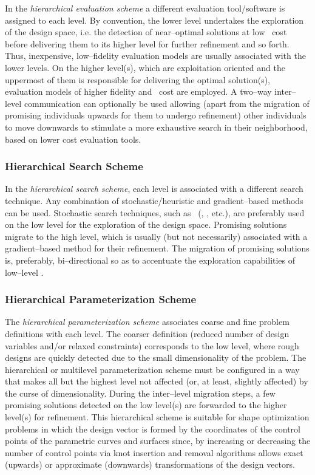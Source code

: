 \documentclass{vki_ls}
\begin{document}
In the \textit{hierarchical evaluation scheme} a different evaluation tool/software is assigned to each level. By convention, the lower level undertakes the exploration of the design space, i.e. the detection of near--optimal solutions at low \CPU\ cost before delivering them to its higher level for further refinement and so forth. 
Thus, inexpensive, low--fidelity evaluation models are usually associated with the lower levels. On the higher level(s), which are exploitation oriented and the uppermost of them is responsible for delivering the optimal solution(s), evaluation models of higher fidelity and \CPU\ cost are employed. 
A two--way inter--level communication can optionally be used allowing (apart from the migration of promising individuals upwards for them to undergo refinement) other individuals to move downwards to stimulate a more exhaustive search in their neighborhood, based on lower cost evaluation tools.

\subsubsection*{Hierarchical Search Scheme}

In the \textit{hierarchical search scheme}, each level is associated with a different search technique. Any combination of stochastic/heuristic and gradient--based methods can be used. Stochastic search techniques, such as \EAs\ (\DEAs, \DMAEAs, etc.), are preferably used on the low level for the exploration of the design space.  Promising solutions migrate to the high level, which is usually (but not necessarily) associated with a gradient--based method for their refinement.  The migration of promising solutions is, preferably, bi--directional so as to accentuate the exploration capabilities of low--level \EAs.

\subsubsection*{Hierarchical Parameterization Scheme}

The \textit{hierarchical parameterization scheme} associates coarse and fine problem definitions with each level. The coarser definition (reduced number of design variables and/or relaxed constraints) corresponds to the low level, where rough designs are quickly detected due to the small dimensionality of the problem. The hierarchical or multilevel parameterization scheme must be configured in a way that makes all but the highest level not affected (or, at least, slightly affected) by the curse of dimensionality. During the inter--level migration steps, a few promising solutions detected on the low level(s) are forwarded to the higher level(s) for refinement. This hierarchical scheme is suitable for shape optimization problems in which the design vector is formed by the coordinates of the control points of the parametric curves and surfaces since, by increasing or decreasing the number of control points via knot insertion and removal algorithms \cite{NURBSBook} allows exact (upwards) or approximate (downwards) transformations of the design vectors.
\end{document}
